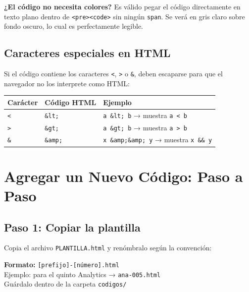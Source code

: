 \documentclass[12pt, a4paper]{article}
\newcommand{\archivo}[1]{\texttt{\textcolor{cpAccent}{#1}}}
\newcommand{\etiquetaHtml}[1]{\texttt{\textcolor{cpKeyword}{<#1>}}}
\begin{document}
\begin{cajaInfo}
    \textbf{¿El código no necesita colores?} Es válido pegar el código
    directamente en texto plano dentro de \etiquetaHtml{pre}\etiquetaHtml{code}
    sin ningún \texttt{span}. Se verá en gris claro sobre fondo oscuro,
    lo cual es perfectamente legible.
\end{cajaInfo}

\subsection{Caracteres especiales en HTML}

Si el código contiene los caracteres \texttt{<}, \texttt{>} o \texttt{\&},
deben escaparse para que el navegador no los interprete como HTML:

\begin{center}
\begin{tabular}{lll}
\toprule
\textbf{Carácter} & \textbf{Código HTML} & \textbf{Ejemplo} \\
\midrule
\texttt{<}  & \texttt{\&lt;}   & \texttt{a \&lt; b} → muestra \texttt{a < b} \\
\texttt{>}  & \texttt{\&gt;}   & \texttt{a \&gt; b} → muestra \texttt{a > b} \\
\texttt{\&} & \texttt{\&amp;}  & \texttt{x \&amp;\&amp; y} → muestra \texttt{x \&\& y} \\
\bottomrule
\end{tabular}
\end{center}


\section{Agregar un Nuevo Código: Paso a Paso}

\subsection{Paso 1: Copiar la plantilla}

Copia el archivo \archivo{PLANTILLA.html} y renómbralo según la convención:

\begin{cajaCodigo}
\textbf{Formato:} \texttt{[prefijo]-[número].html}\\[4pt]
Ejemplo: para el quinto Analytics → \texttt{ana-005.html}\\
Guárdalo dentro de la carpeta \texttt{codigos/}
\end{cajaCodigo}
\end{document}
